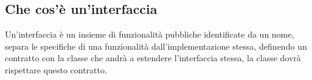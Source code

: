 \documentclass[12pt, a4paper, openany]{book}
\begin{document}
\subsection*{Che cos'è un'interfaccia}
Un'interfaccia è un insieme di funzionalità pubbliche identificate da un nome,
separa le specifiche di una funzionalità dall'implementazione stessa, definendo un contratto
con la classe che andrà a estendere l'interfaccia stessa, la classe dovrà rispettare questo
contratto.
\end{document}
